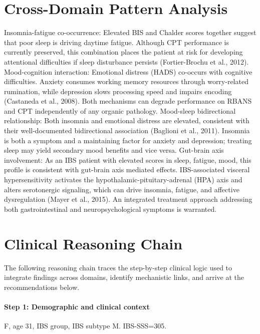 \documentclass[11pt,a4paper]{article}
\begin{document}
\section{Cross-Domain Pattern Analysis}
Insomnia-fatigue co-occurrence: Elevated BIS and Chalder scores together suggest that poor sleep is driving daytime fatigue. Although CPT performance is currently preserved, this combination places the patient at risk for developing attentional difficulties if sleep disturbance persists (Fortier-Brochu et al., 2012). Mood-cognition interaction: Emotional distress (HADS) co-occurs with cognitive difficulties. Anxiety consumes working memory resources through worry-related rumination, while depression slows processing speed and impairs encoding (Castaneda et al., 2008). Both mechanisms can degrade performance on RBANS and CPT independently of any organic pathology. Mood-sleep bidirectional relationship: Both insomnia and emotional distress are elevated, consistent with their well-documented bidirectional association (Baglioni et al., 2011). Insomnia is both a symptom and a maintaining factor for anxiety and depression; treating sleep may yield secondary mood benefits and vice versa. Gut-brain axis involvement: As an IBS patient with elevated scores in sleep, fatigue, mood, this profile is consistent with gut-brain axis mediated effects. IBS-associated visceral hypersensitivity activates the hypothalamic-pituitary-adrenal (HPA) axis and alters serotonergic signaling, which can drive insomnia, fatigue, and affective dysregulation (Mayer et al., 2015). An integrated treatment approach addressing both gastrointestinal and neuropsychological symptoms is warranted.

\section{Clinical Reasoning Chain}

The following reasoning chain traces the step-by-step clinical logic used to integrate findings across domains, identify mechanistic links, and arrive at the recommendations below.

\paragraph{Step 1: Demographic and clinical context}
F, age 31, IBS group, IBS subtype M. IBS-SSS=305.
\end{document}
